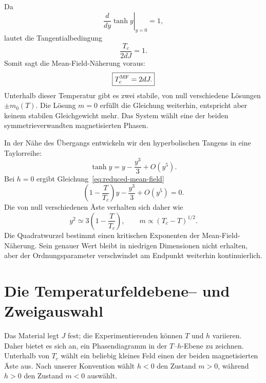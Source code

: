 Da
\begin{equation}
\left.\frac{d}{dy}\tanh y\right|_{y=0}=1,
\end{equation}
lautet die Tangentialbedingung
\begin{equation}
\frac{T_c}{2dJ}=1.
\end{equation}
Somit sagt die Mean-Field-Näherung voraus:
\begin{equation}
\boxed{T_c^{\rm MF}=2dJ.}
\label{eq:sm10-mean-field-tc}
\end{equation}
Unterhalb dieser Temperatur gibt es zwei stabile, von null verschiedene Lösungen \(\pm m_0(T)\). Die Lösung \(m=0\) erfüllt die Gleichung weiterhin, entspricht aber keinem stabilen Gleichgewicht mehr. Das System wählt eine der beiden symmetrieverwandten magnetisierten Phasen.

\begin{classroomqa}
\end{classroomqa}

In der Nähe des Übergangs entwickeln wir den hyperbolischen Tangens in eine Taylorreihe:
\begin{equation}
\tanh y=y-\frac{y^3}{3}+O(y^5).
\end{equation}
Bei \(h=0\) ergibt Gleichung~\eqref{eq:reduced-mean-field}
\begin{equation}
\left(1-\frac{T}{T_c}\right)y-\frac{y^3}{3}+O(y^5)=0.
\end{equation}
Die von null verschiedenen Äste verhalten sich daher wie
\begin{equation}
y^2\simeq3\left(1-\frac{T}{T_c}\right),
\qquad
m\propto(T_c-T)^{1/2}.
\label{eq:mf-beta-exponent}
\end{equation}
Die Quadratwurzel bestimmt einen kritischen Exponenten der Mean-Field-Näherung. Sein genauer Wert bleibt in niedrigen Dimensionen nicht erhalten, aber der Ordnungsparameter verschwindet am Endpunkt weiterhin kontinuierlich.

\section{Die Temperaturfeldebene-- und Zweigauswahl}

Das Material legt \(J\) fest; die Experimentierenden können \(T\) und \(h\) variieren. Daher bietet es sich an, ein Phasendiagramm in der \(T\)--\(h\)-Ebene zu zeichnen. Unterhalb von \(T_c\) wählt ein beliebig kleines Feld einen der beiden magnetisierten Äste aus. Nach unserer Konvention wählt \(h<0\) den Zustand \(m>0\), während \(h>0\) den Zustand \(m<0\) auswählt.

